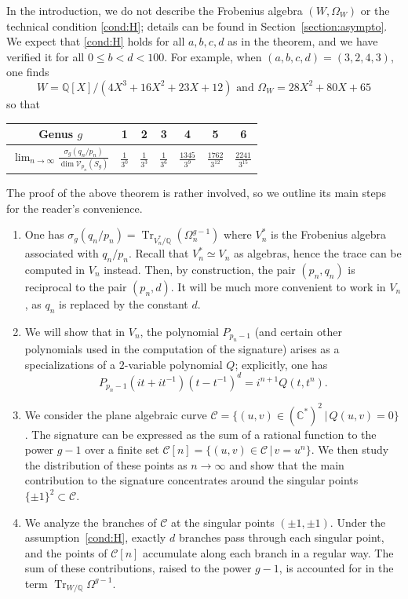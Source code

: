 \documentclass{amsart}
\newcommand{\Q}{\mathbb{Q}}
\newcommand{\C}{\mathbb{C}}
\newcommand{\calC}{\mathcal{C}}
\newcommand{\calV}{\mathcal{V}}
\DeclareMathOperator{\Tr}{Tr}
\theoremstyle{definition}
\begin{document}
In the introduction, we do not describe the Frobenius algebra $(W,\Omega_W)$ or the technical condition \eqref{cond:H}; details can be found in Section~\ref{section:asympto}. We expect that \eqref{cond:H} holds for all $a,b,c,d$ as in the theorem, and we have verified it for all $0\le b<d<100$. For example, when $(a,b,c,d)=(3,2,4,3)$, one finds 
$$W=\Q[X]/(4X^3 + 16X^2 + 23X + 12)\text{ and }\Omega_W=28 X^2+80X+65$$
so that 
\begin{center}
\renewcommand{\arraystretch}{1.3}
\begin{tabular}{|c|cccccc|}
\hline
Genus $g$ & 1 & 2 & 3 & 4 & 5 & 6 \\ 
\hline
$\displaystyle\lim_{n\to\infty} 
\tfrac{\sigma_g(q_n/p_n)}{\dim \calV_{p_n}(S_g)}$
& $\tfrac{1}{3^0}$ & $\tfrac{1}{3^3}$ & $\tfrac{1}{3^6}$ 
& $\tfrac{1345}{3^9}$ & $\tfrac{1762}{3^{12}}$ & $\tfrac{2241}{3^{15}}$ \\
\hline
\end{tabular}
\end{center}
\smallskip

The proof of the above theorem is rather involved, so we outline its main steps for the reader’s convenience.
\begin{enumerate}
\item[Step 1:] One has $\sigma_g(q_n/p_n)=\Tr_{V_n^*/\Q}(\Omega_n^{g-1})$ where $V_n^*$ is the Frobenius algebra associated with $q_n/p_n$. Recall that $V_n^* \simeq V_n$ as algebras, hence the trace can be computed in $V_n$ instead. Then, by construction, the pair $(p_n,q_n)$ is reciprocal to the pair $(p_n,d)$. It will be much more convenient to work in $V_n$, as $q_n$ is replaced by the constant $d$. 
\item[Step 2:] We will show that in $V_n$, the polynomial $P_{p_n-1}$ (and certain other polynomials used in the computation of the signature) arises as a specializations of a $2$-variable polynomial $Q$; explicitly, one has $$P_{p_n-1}(it+it^{-1})(t-t^{-1})^d=i^{n+1} Q(t,t^n).$$ 
\item[Step 3:] We consider the plane algebraic curve $\calC=\{(u,v)\in (\C^*)^2 \, | \, Q(u,v)=0\}$. The signature can be expressed as the sum of a rational function to the power $g-1$ over a finite set $\calC[n]=\{(u,v)\in \calC \, | \, v=u^n\}$. We then study the distribution of these points as $n\to \infty$ and show that the main contribution to the signature concentrates around the singular points $\{\pm 1\}^2\subset \calC$.
\item[Step 4:] We analyze the branches of $\calC$ at the singular points $(\pm 1,\pm 1)$. Under the assumption~\eqref{cond:H}, exactly $d$ branches pass through each singular point, and the points of $\calC[n]$ accumulate along each branch in a regular way. The sum of these contributions, raised to the power $g-1$, is accounted for in the term $\Tr_{W/\Q}\Omega^{g-1}$. 
\end{enumerate}
\end{document}
